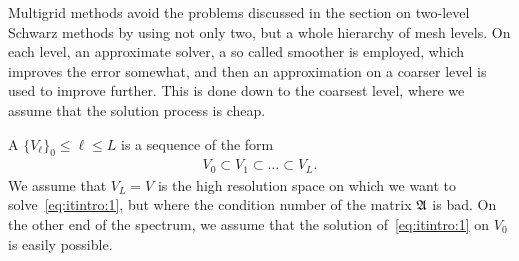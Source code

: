 
\begin{intro}
   Multigrid methods avoid the problems discussed
  in the section on two-level Schwarz methods by using not only two,
  but a whole hierarchy of mesh levels. On each level, an approximate
  solver, a so called smoother is employed, which improves the error
  somewhat, and then an approximation on a coarser level is used to
  improve further. This is done down to the coarsest level, where we
  assume that the solution process is cheap.
\end{intro}

\begin{definition}
  A  $\{V_\ell\}_0\le \ell \le L$ is a
  sequence of the form
  \begin{gather}
    V_0 \subset V_1 \subset \dots \subset V_L.
  \end{gather}
  We assume that $V_L = V$ is the high resolution space on which we
  want to solve~\eqref{eq:itintro:1}, but where the condition number
  of the matrix $\mathfrak{A}$ is bad. On the other end of the spectrum, we
  assume that the solution of~\eqref{eq:itintro:1} on $V_0$ is easily
  possible.
\end{definition}

